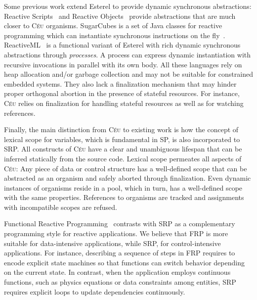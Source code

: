 \documentclass{acm_proc_article-sp}
\newcommand{\CEU}{\textsc{C\'{e}u}\xspace}
\newcommand{\1}{\;}
\newcommand{\2}{\;\;}
\newcommand{\3}{\;\;\;}
\newcommand{\5}{\;\;\;\;\;}
\begin{document}
Some previous work extend Esterel to provide dynamic synchronous abstractions:
Reactive Scripts~\cite{rp.scripts} and Reactive Objects~\cite{rp.scripts} 
provide abstractions that are much closer to \CEU organisms.
%
SugarCubes is a set of Java classes for reactive programming which can 
instantiate synchronous instructions on the fly~\cite{sugarcubes}.
%
ReactiveML~\cite{rml} is a functional variant of Esterel with rich dynamic 
synchronous abstractions through \emph{processes}.
A process can express dynamic instantiation with recursive invocations in 
parallel with its own body.
%
All these languages rely on heap allocation and/or garbage collection and may 
not be suitable for constrained embedded systems.
%
%
They also lack a finalization mechanism that may hinder proper orthogonal 
abortion in the presence of stateful resources.
For instance, \CEU relies on finalization for handling stateful resources as 
well as for watching references.

Finally, the main distinction from \CEU to existing work is how the concept of 
lexical scope for variables, which is fundamental in SP, is also incorporated 
to SRP.
%
All constructs of \CEU have a clear and unambiguous lifespan that can be 
inferred statically from the source code.
%
Lexical scope permeates all aspects of \CEU:
Any piece of data or control structure has a well-defined scope that can be 
abstracted as an organism and safely aborted through finalization.
%
Even dynamic instances of organisms reside in a pool, which in turn, has a 
well-defined scope with the same properties.
%
References to organisms are tracked and assignments with incompatible scopes 
are refused.

Functional Reactive Programming~\cite{frp.principles} contrasts with SRP as a
complementary programming style for reactive applications.
%
We believe that FRP is more suitable for data-intensive applications, while 
SRP, for control-intensive applications.
%
For instance, describing a sequence of steps in FRP requires to encode explicit 
state machines so that functions can switch behavior depending on the current 
state.
%
In contrast, when the application employs continuous functions, such as physics 
equations or data constraints among entities, SRP requires explicit loops to 
update dependencies continuously.
\end{document}
